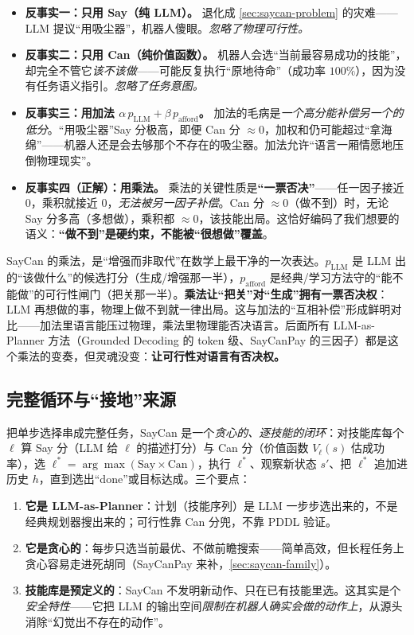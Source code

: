 \begin{itemize}
  \item \textbf{反事实一：只用 Say（纯 LLM）。} 退化成 \cref{sec:saycan-problem} 的灾难——LLM 提议“用吸尘器”，机器人傻眼。\emph{忽略了物理可行性。}
  \item \textbf{反事实二：只用 Can（纯价值函数）。} 机器人会选“当前最容易成功的技能”，却完全不管它\emph{该不该做}——可能反复执行“原地待命”（成功率 $100\%$），因为没有任务语义指引。\emph{忽略了任务意图。}
  \item \textbf{反事实三：用加法 $\alpha\, p_{\text{LLM}} + \beta\, p_{\text{afford}}$。} 加法的毛病是\emph{一个高分能补偿另一个的低分}。“用吸尘器”Say 分极高，即便 Can 分 $\approx 0$，加权和仍可能超过“拿海绵”——机器人还是会去够那个不存在的吸尘器。加法允许“语言一厢情愿地压倒物理现实”。
  \item \textbf{反事实四（正解）：用乘法。} 乘法的关键性质是\textbf{“一票否决”}——任一因子接近 $0$，乘积就接近 $0$，\emph{无法被另一因子补偿}。Can 分 $\approx 0$（做不到）时，无论 Say 分多高（多想做），乘积都 $\approx 0$，该技能出局。这恰好编码了我们想要的语义：\textbf{“做不到”是硬约束，不能被“很想做”覆盖}。
\end{itemize}

\begin{insight}
SayCan 的乘法，是“增强而非取代”在数学上最干净的一次表达。$p_{\text{LLM}}$ 是 LLM 出的“该做什么”的候选打分（生成/增强那一半），$p_{\text{afford}}$ 是经典/学习方法守的“能不能做”的可行性闸门（把关那一半）。\textbf{乘法让“把关”对“生成”拥有一票否决权}：LLM 再想做的事，物理上做不到就一律出局。这与加法的“互相补偿”形成鲜明对比——加法里语言能压过物理，乘法里物理能否决语言。后面所有 LLM-as-Planner 方法（Grounded Decoding 的 token 级、SayCanPay 的三因子）都是这个乘法的变奏，但灵魂没变：\textbf{让可行性对语言有否决权。}
\end{insight}

\subsection{完整循环与“接地”来源}
\label{sec:saycan-loop}

把单步选择串成完整任务，SayCan 是一个\emph{贪心的、逐技能的闭环}：对技能库每个 $\ell$ 算 Say 分（LLM 给 $\ell$ 的描述打分）与 Can 分（价值函数 $V_\ell(s)$ 估成功率），选 $\ell^\ast=\arg\max(\text{Say}\times\text{Can})$，执行 $\ell^\ast$、观察新状态 $s'$、把 $\ell^\ast$ 追加进历史 $h$，直到选出“done”或目标达成。三个要点：

\begin{enumerate}
  \item \textbf{它是 LLM-as-Planner}：计划（技能序列）是 LLM 一步步选出来的，不是经典规划器搜出来的；可行性靠 Can 分兜，不靠 PDDL 验证。
  \item \textbf{它是贪心的}：每步只选当前最优、不做前瞻搜索——简单高效，但长程任务上贪心容易走进死胡同（SayCanPay 来补，\cref{sec:saycan-family}）。
  \item \textbf{技能库是预定义的}：SayCan 不发明新动作、只在已有技能里选。这其实是个\emph{安全特性}——它把 LLM 的输出空间\emph{限制在机器人确实会做的动作上}，从源头消除“幻觉出不存在的动作”。
\end{enumerate}

